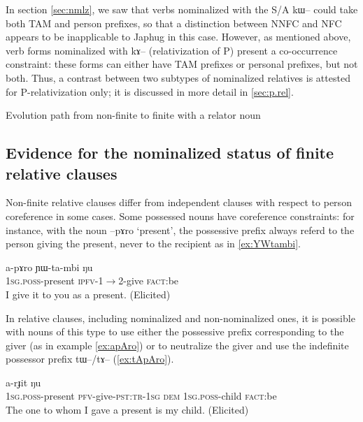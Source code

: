 \documentclass[oldfontcommands,oneside,a4paper,11pt]{article}
\newcommand{\ipa}[1]{{\phon #1}} %
\newcommand{\topic}{\textsc{dem}}
\begin{document}
In section \ref{sec:nmlz}, we saw that  verbs nominalized with the S/A \ipa{kɯ}-- could take both TAM and person prefixes, so that a distinction between NNFC and NFC appears to be inapplicable to Japhug in this case. However, as mentioned above, verb forms nominalized with \ipa{kɤ}-- (relativization of P) present a  co-occurrence constraint: these forms can either have TAM prefixes or personal prefixes, but not both. Thus, a contrast between two subtypes of nominalized relatives is attested for P-relativization only; it is discussed in more detail in \ref{sec:p.rel}.

Evolution path from non-finite to finite with a relator noun

\subsection{Evidence for the nominalized status of finite relative clauses}


	Non-finite relative clauses differ from independent clauses with respect to person coreference in some cases. Some possessed nouns have coreference constraints: for instance, with the noun \ipa{--pɤro} `present', the possessive prefix always referd to the person giving the present, never to the recipient as in \ref{ex:YWtambi}. 
	
			\begin{exe}
\ex \label{ex:YWtambi}
\gll
	\ipa{a-pɤro}  	\ipa{ɲɯ-ta-mbi}  	\ipa{ŋu}  \\
	\textsc{1sg.poss}-present \textsc{ipfv}-1$\rightarrow$2-give \textsc{fact}:be \\
	\glt I give it to you as a present. (Elicited)
 	  \end{exe} 
	 
	 In relative clauses, including nominalized and non-nominalized ones, it is possible with nouns of this type to use either the possessive prefix corresponding to the giver (as in example \ref{ex:apAro}) or to neutralize the giver and use the indefinite possessor prefix \ipa{tɯ}--/\ipa{tɤ}-- (\ref{ex:tApAro}).
	 

 		\begin{exe}
\ex \label{ex:apAro}
\gll
[\ipa{a-pɤro}  	\ipa{nɯ-mbi-t-a}]  	\ipa{nɯ}  	\ipa{a-rɟit}  	\ipa{ŋu}  \\
	\textsc{1sg.poss}-present \textsc{pfv}-give-\textsc{pst:tr-1sg} 	  \topic{} \textsc{1sg.poss}-child \textsc{fact}:be \\
\glt The one to whom I gave a present is my child. (Elicited)
 	  \end{exe} 
\end{document}
